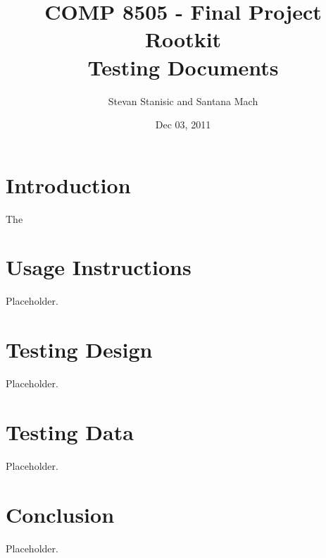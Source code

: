 \documentclass[titlepage]{article}
\begin{document}
\author{Stevan Stanisic and Santana Mach}
\title{COMP 8505 - Final Project \\ Rootkit \\ Testing Documents}
\date{Dec 03, 2011}
\maketitle{}

\tableofcontents
\pagebreak

\section{Introduction}

The 

\section{Usage Instructions}

Placeholder.

\section{Testing Design}

Placeholder.

\section{Testing Data}

Placeholder.

\section{Conclusion}

Placeholder.
\end{document}
